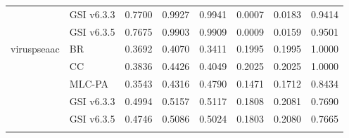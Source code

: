 \documentclass[11pt,a4paper,twoside]{article}
\begin{document}
\begin{landscape}
\begin{longtable}{llrrrrrr}
 & GSI v6.3.3 & 0.7700 & 0.9927 & 0.9941 & 0.0007 & 0.0183 & 0.9414 \\
 & GSI v6.3.5 & 0.7675 & 0.9903 & 0.9909 & 0.0009 & 0.0159 & 0.9501 \\
\addlinespace[2pt]
viruspseaac & BR & 0.3692 & 0.4070 & 0.3411 & 0.1995 & 0.1995 & 1.0000 \\
 & CC & 0.3836 & 0.4426 & 0.4049 & 0.2025 & 0.2025 & 1.0000 \\
 & MLC-PA & 0.3543 & 0.4316 & 0.4790 & 0.1471 & 0.1712 & 0.8434 \\
 & GSI v6.3.3 & 0.4994 & 0.5157 & 0.5117 & 0.1808 & 0.2081 & 0.7690 \\
 & GSI v6.3.5 & 0.4746 & 0.5086 & 0.5024 & 0.1803 & 0.2080 & 0.7665 \\
\addlinespace[2pt]
\bottomrule
\end{longtable}
\end{landscape}
\end{document}
